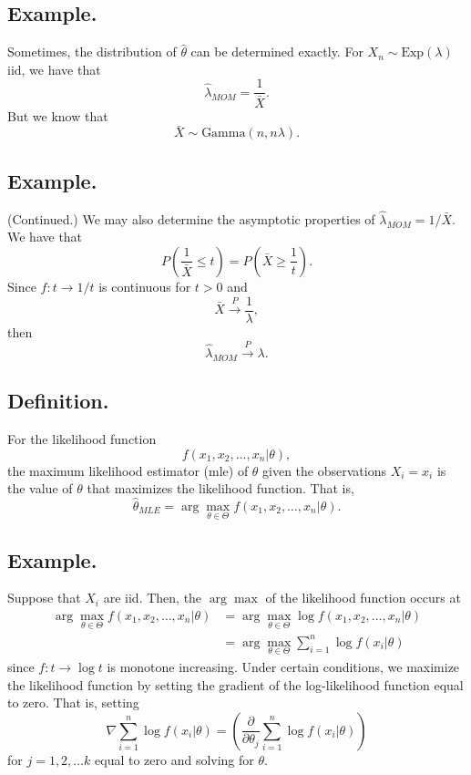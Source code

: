\documentclass[titlepage]{article}
\begin{document}
\subsection{Example.} Sometimes, the distribution of $\hat{\theta}$ can be determined exactly. For $X_{n} \sim \text{Exp}(\lambda)$ iid, we have that 
$$\hat{\lambda}_{MOM} = \frac{1}{\bar{X}}.$$
But we know that 
$$\bar{X} \sim \text{Gamma}(n, n\lambda).$$

\subsection{Example.} (Continued.) We may also determine the asymptotic properties of $\hat{\lambda}_{MOM} = 1/\bar{X}$. We have that 
$$P\left(\frac{1}{\bar{X}} \leq t\right) = P(\bar{X} \geq \frac{1}{t}).$$
Since $f: t \to 1/t$ is continuous for $t > 0$ and 
$$\bar{X} \xrightarrow{P} \frac{1}{\lambda},$$
then 
$$\hat{\lambda}_{MOM} \xrightarrow{P} \lambda.$$

\subsection{Definition.} For the likelihood function 
$$f(x_{1}, x_{2}, \ldots, x_{n}|\theta),$$
the maximum likelihood estimator (mle) of $\theta$ given the observations $X_{i} = x_{i}$ is the value of $\theta$ that maximizes the likelihood function. That is, 
$$\hat{\theta}_{MLE} = \arg\max_{\theta \in \Theta}f(x_{1}, x_{2}, \ldots, x_{n}|\theta).$$

\subsection{Example.} Suppose that $X_{i}$ are iid. Then, the $\arg\max$ of the likelihood function occurs at 
\begin{align*}
    \arg\max_{\theta \in \Theta}f(x_{1}, x_{2}, \ldots, x_{n}|\theta) &= \arg\max_{\theta \in \Theta}\log f(x_{1}, x_{2}, \ldots, x_{n}|\theta) \\
                                                   &= \arg\max_{\theta \in \Theta}\sum_{i=1}^{n}\log f(x_{i}|\theta)
\end{align*}
since $f: t \to \log t$ is monotone increasing. Under certain conditions, we maximize the likelihood function by setting the gradient of the log-likelihood function equal to zero. That is, setting 
$$\nabla \sum_{i=1}^{n}\log f(x_{i}|\theta) = \left(\frac{\partial}{\partial\theta_{j}}\sum_{i=1}^{n}\log f(x_{i}|\theta)\right)$$
for $j = 1, 2, \ldots k$ equal to zero and solving for $\theta$.
\end{document}
